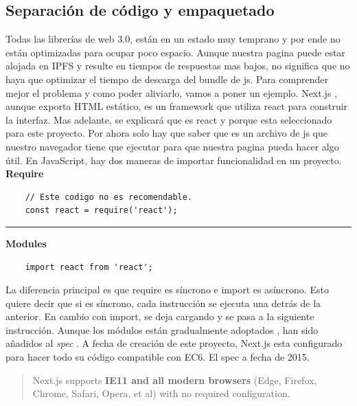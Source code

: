 \subsection{Separación de código y empaquetado}
Todas las librerías de web 3.0, están en un estado muy temprano y por ende no están optimizadas para ocupar poco espacio. Aunque nuestra pagina puede estar alojada en IPFS \cite{web:ipfs} y resulte en tiempos de respuestas mas bajos, no significa que no haya que optimizar el tiempo de descarga del bundle de js.
Para comprender mejor el problema y como poder aliviarlo, vamos a poner un ejemplo.
Next.js \cite{web:next.js}, aunque exporta HTML estático, es un framework que utiliza react para construir la interfaz. Mas adelante, se explicará que es react y porque esta seleccionado para este proyecto. Por ahora solo hay que saber que es un archivo de js que nuestro navegador tiene que ejecutar para que nuestra pagina pueda hacer algo útil.
En JavaScript, hay dos maneras de importar funcionalidad en un proyecto.\\
\textbf{Require}\\
\begin{lstlisting}
    // Este codigo no es recomendable.
    const react = require('react');
\end{lstlisting}
\noindent\rule{\textwidth}{0.4pt}
\textbf{Modules}\\
\begin{lstlisting}
    import react from 'react';
\end{lstlisting}
La diferencia principal es que require es síncrono e import es asíncrono.
Esto quiere decir que si es síncrono, cada instrucción se ejecuta una detrás de la anterior. En cambio con import, se deja cargando y se pasa a la siguiente instrucción.
Aunque los módulos están gradualmente adoptados \cite{web:canIuse}, han sido añadidos al \textit{spec} \cite{web:ecma}. A fecha de creación de este proyecto, Next.js \cite{web:next.js} esta configurado para hacer todo su código compatible con EC6. El spec a fecha de 2015.
\begin{quote}
    Next.js \cite{web:next.js} supports \textbf{IE11 and all modern browsers} (Edge, Firefox, Chrome, Safari, Opera, et al) with no required configuration. \cite{web:next_supported}
\end{quote}
